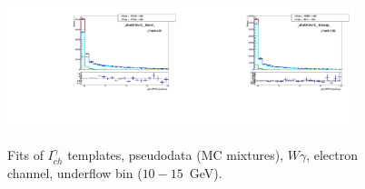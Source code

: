 \begin{figure}[htb]
  \begin{center}
   \includegraphics[width=0.45\textwidth]{../figs/figs_v11/ELECTRON_WGamma/TemplateFits/c_TEMPL_CHISO_UNblind__phoEt10to15__Barrel__RooFit_MCclosure.pdf}\includegraphics[width=0.45\textwidth]{../figs/figs_v11/ELECTRON_WGamma/TemplateFits/c_TEMPL_CHISO_UNblind__phoEt10to15__Endcap__RooFit_MCclosure.pdf}\\
  \label{fig:templateFits_MCclosure_CHISO_ELECTRON_0}
  \caption{Fits of $I_{ch}^{\gamma}$ templates, pseudodata (MC mixtures), $W\gamma$, electron channel, underflow bin ($10-15$~GeV).}
  \end{center}
\end{figure}

